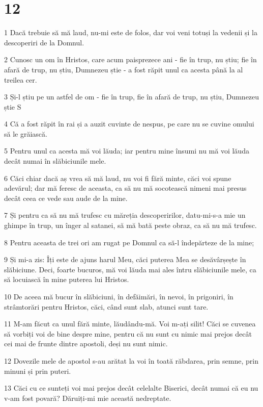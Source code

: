 \chapter{12}

\par 1 Dacă trebuie să mă laud, nu-mi este de folos, dar voi veni totuși la vedenii și la descoperiri de la Domnul.
\par 2 Cunosc un om în Hristos, care acum paisprezece ani - fie în trup, nu știu; fie în afară de trup, nu știu, Dumnezeu știe - a fost răpit unul ca acesta până la al treilea cer.
\par 3 Și-l știu pe un astfel de om - fie în trup, fie în afară de trup, nu știu, Dumnezeu știe S
\par 4 Că a fost răpit în rai și a auzit cuvinte de nespus, pe care nu se cuvine omului să le grăiască.
\par 5 Pentru unul ca acesta mă voi lăuda; iar pentru mine însumi nu mă voi lăuda decât numai în slăbiciunile mele.
\par 6 Căci chiar dacă aș vrea să mă laud, nu voi fi fără minte, căci voi spune adevărul; dar mă feresc de aceasta, ca să nu mă socotească nimeni mai presus decât ceea ce vede sau aude de la mine.
\par 7 Și pentru ca să nu mă trufesc cu măreția descoperirilor, datu-mi-s-a mie un ghimpe în trup, un înger al satanei, să mă bată peste obraz, ca să nu mă trufesc.
\par 8 Pentru aceasta de trei ori am rugat pe Domnul ca să-l îndepărteze de la mine;
\par 9 Și mi-a zis: Îți este de ajuns harul Meu, căci puterea Mea se desăvârșește în slăbiciune. Deci, foarte bucuros, mă voi lăuda mai ales întru slăbiciunile mele, ca să locuiască în mine puterea lui Hristos.
\par 10 De aceea mă bucur în slăbiciuni, în defăimări, în nevoi, în prigoniri, în strâmtorări pentru Hristos, căci, când sunt slab, atunci sunt tare.
\par 11 M-am făcut ca unul fără minte, lăudându-mă. Voi m-ați silit! Căci se cuvenea să vorbiți voi de bine despre mine, pentru că nu sunt cu nimic mai prejos decât cei mai de frunte dintre apostoli, deși nu sunt nimic.
\par 12 Dovezile mele de apostol s-au arătat la voi în toată răbdarea, prin semne, prin minuni și prin puteri.
\par 13 Căci cu ce sunteți voi mai prejos decât celelalte Biserici, decât numai că eu nu v-am fost povară? Dăruiți-mi mie această nedreptate.
